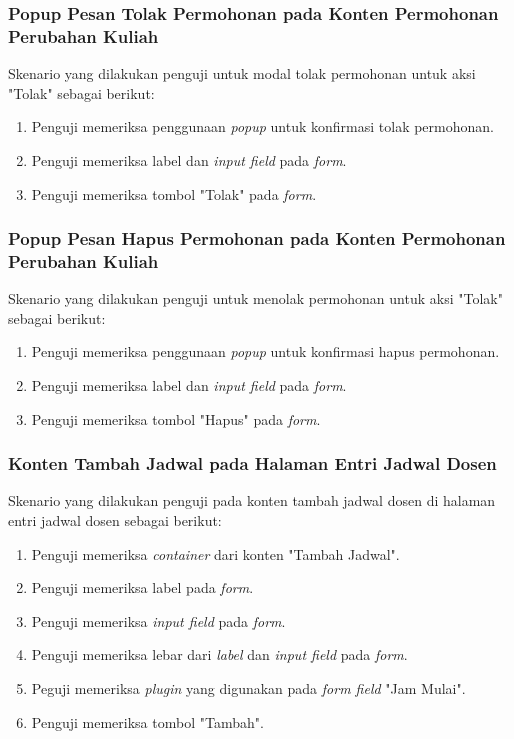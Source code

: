 \subsubsection{Popup Pesan Tolak Permohonan pada Konten Permohonan Perubahan Kuliah}
Skenario yang dilakukan penguji untuk modal tolak permohonan untuk aksi "Tolak" sebagai berikut:
\begin{enumerate}
	\item Penguji memeriksa penggunaan \textit{popup} untuk konfirmasi tolak permohonan.
	\item Penguji memeriksa label dan \textit{input field} pada \textit{form}.
	\item Penguji memeriksa tombol "Tolak" pada \textit{form}.	
\end{enumerate}

\subsubsection{Popup Pesan Hapus Permohonan pada Konten Permohonan Perubahan Kuliah}
Skenario yang dilakukan penguji untuk menolak permohonan untuk aksi "Tolak" sebagai berikut:
\begin{enumerate}
	\item Penguji memeriksa penggunaan \textit{popup} untuk konfirmasi hapus permohonan.
	\item Penguji memeriksa label dan \textit{input field} pada \textit{form}.
	\item Penguji memeriksa tombol "Hapus" pada \textit{form}.	
\end{enumerate}

\subsubsection{Konten Tambah Jadwal pada Halaman Entri Jadwal Dosen}
Skenario yang dilakukan penguji pada konten tambah jadwal dosen di halaman entri jadwal dosen sebagai berikut:
\begin{enumerate}
	\item Penguji memeriksa \textit{container} dari konten "Tambah Jadwal".	
	\item Penguji memeriksa label pada \textit{form}. 
	\item Penguji memeriksa \textit{input field} pada \textit{form}.
	\item Penguji memeriksa lebar dari \textit{label} dan \textit{input field} pada \textit{form}.
	\item Peguji memeriksa \textit{plugin} yang digunakan pada \textit{form field} "Jam Mulai".
	\item Penguji memeriksa tombol "Tambah".
\end{enumerate}

